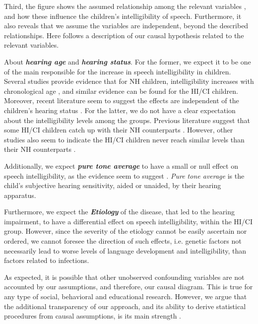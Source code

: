 Third, the figure shows the assumed relationship among the relevant variables \cite{Niparko_et_al_2010, Boons_et_al_2012, Gillis_2018, Fagan_et_al_2020}, and how these influence the children's intelligibility of speech. Furthermore, it also reveals that we assume the variables are independent, beyond the described relationships. Here follows a description of our causal hypothesis related to the relevant variables.

About \textbf{\textit{hearing age}} and \textbf{\textit{hearing status}}. For the former, we expect it to be one of the main responsible for the increase in speech intelligibility in children. Several studies provide evidence that for NH children, intelligibility increases with chronological age \cite{Chin_et_al_2001, Chin_et_al_2003, Flipsen_2006, Flipsen_2008, Baudonck_et_al_2009, Bowen_2011, Hustad_et_al_2020}, and similar evidence can be found for the HI/CI children. Moreover, recent literature seem to suggest the effects are independent of the children's hearing status \cite{Boonen_et_al_2021}. For the latter, we do not have a clear expectation about the intelligibility levels among the groups. Previous literature suggest that some HI/CI children catch up with their NH counterparts \cite{Wie_2010, Habib_et_al_2010, Boons_et_al_2013, Geers_et_al_2013, Bruijnzeel_et_al_2016, Dettman_et_al_2016, Wie_et_al_2020}. However, other studies also seem to indicate the HI/CI children never reach similar levels than their NH counterparts \cite{Nicholas_et_al_2007, Castellanos_et_al_2014, Chin_et_al_2014, Geers_et_al_2016, Freeman_et_al_2017, Duchesne_et_al_2019, Grandon_et_al_2020}. 

Additionally, we expect \textbf{\textit{pure tone average}} to have a small or null effect on speech intelligibility, as the evidence seem to suggest \cite{Boonen_et_al_2021}. \textit{Pure tone average} is the child's subjective hearing sensitivity, aided or unaided, by their hearing apparatus.

Furthermore, we expect the \textbf{\textit{Etiology}} of the disease, that led to the hearing impairment, to have a differential effect on speech intelligibility, within the HI/CI group. However, since the severity of the etiology cannot be easily ascertain nor ordered, we cannot foresee the direction of such effects, i.e. genetic factors not necessarily lead to worse levels of language development and intelligibility, than factors related to infections.

As expected, it is possible that other unobserved confounding variables are not accounted by our assumptions, and therefore, our causal diagram. This is true for any type of social, behavioral and educational research. However, we argue that the additional transparency of our approach, and its ability to derive statistical procedures from causal assumptions, is its main strength \cite{McElreath_2020, Yarkoni_2020, Rohrer_et_al_2021}.

